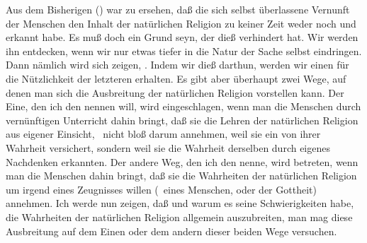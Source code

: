 Aus dem Bisherigen () war zu ersehen, daß die sich selbst überlassene Vernunft der Menschen den Inhalt der natürlichen Religion zu keiner Zeit weder  noch  und  erkannt habe. Es muß doch ein Grund seyn, der dieß verhindert hat. Wir werden ihn entdecken, wenn wir nur etwas tiefer in die Natur der Sache selbst eindringen. Dann nämlich wird sich zeigen, . Indem wir dieß darthun, werden wir einen  für die Nützlichkeit der letzteren erhalten. Es gibt aber überhaupt zwei Wege, auf denen man sich die Ausbreitung der natürlichen Religion vorstellen kann. Der Eine, den ich den  nennen will, wird eingeschlagen, wenn man die Menschen durch vernünftigen Unterricht dahin bringt, daß sie die Lehren der natürlichen Religion aus eigener Einsicht, \dh\ nicht bloß darum annehmen, weil sie ein  von ihrer Wahrheit versichert, sondern weil sie die Wahrheit derselben durch eigenes Nachdenken erkannten. Der andere Weg, den ich den  nenne, wird betreten, wenn man die Menschen dahin bringt, daß sie die Wahrheiten der natürlichen Religion um irgend eines Zeugnisses willen (\zB\ eines Menschen, oder der Gottheit) annehmen. Ich werde nun zeigen, daß und warum es seine Schwierigkeiten habe, die Wahrheiten der natürlichen Religion allgemein auszubreiten, man mag diese Ausbreitung auf dem Einen oder dem andern dieser beiden Wege versuchen.~

